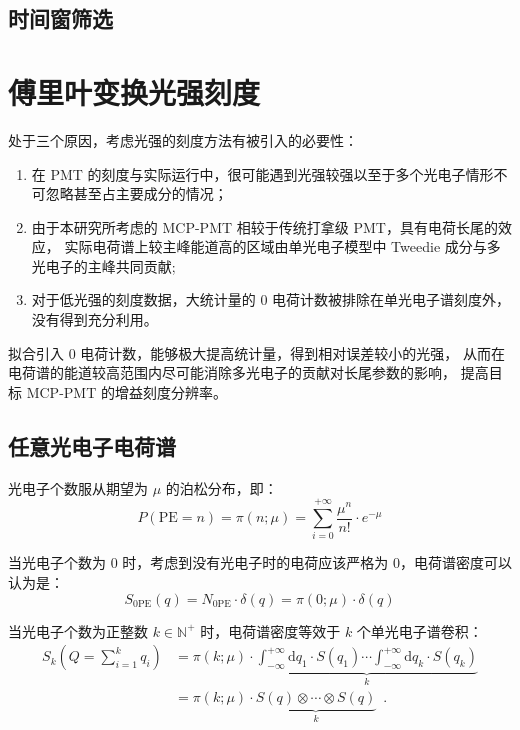 \subsection{时间窗筛选}


\section{傅里叶变换光强刻度}

处于三个原因，考虑光强的刻度方法有被引入的必要性：
\begin{enumerate}
    \item 在 PMT 的刻度与实际运行中，很可能遇到光强较强以至于多个光电子情形不可忽略甚至占主要成分的情况；
    \item 由于本研究所考虑的 MCP-PMT 相较于传统打拿级 PMT，具有电荷长尾的效应，
    实际电荷谱上较主峰能道高的区域由单光电子模型中 Tweedie 成分与多光电子的主峰共同贡献;
    \item 对于低光强的刻度数据，大统计量的 0 电荷计数被排除在单光电子谱刻度外，没有得到充分利用。
\end{enumerate}

拟合引入 0 电荷计数，能够极大提高统计量，得到相对误差较小的光强，
从而在电荷谱的能道较高范围内尽可能消除多光电子的贡献对长尾参数的影响，
提高目标 MCP-PMT 的增益刻度分辨率。

\subsection{任意光电子电荷谱}\label{sec:dft}

光电子个数服从期望为 $\mu$ 的泊松分布，即：
\begin{equation}
    P(\text{PE}=n) = \pi(n;\mu)=\sum_{i=0}^{+\infty}\frac{\mu^{n}}{n!}\cdot e^{-\mu}
\end{equation}

当光电子个数为 0 时，考虑到没有光电子时的电荷应该严格为 0，电荷谱密度可以认为是：
\begin{equation}
    S_{0\text{PE}}(q)=N_{0\text{PE}}\cdot\delta(q)=\pi(0;\mu)\cdot\delta(q)
\end{equation}

当光电子个数为正整数 $k\in\mathbb{N}^{+}$ 时，电荷谱密度等效于 $k$ 个单光电子谱卷积：
\begin{align}
    S_{k}(Q = \sum_{i = 1}^{k} q_i ) 
    & = \pi(k;\mu)\cdot\underbrace{
    \int_{-\infty }^{+\infty}\mathrm{d}q_1\cdot S(q_1)
    \cdots \int_{-\infty }^{+\infty}\mathrm{d}q_k\cdot S(q_k)
    }_{k}\\
    &=\pi(k;\mu)\cdot\underbrace{S(q)\otimes\cdots\otimes S(q)}_{k}\enspace.
    \label{eq:kpe-charge}
\end{align}

